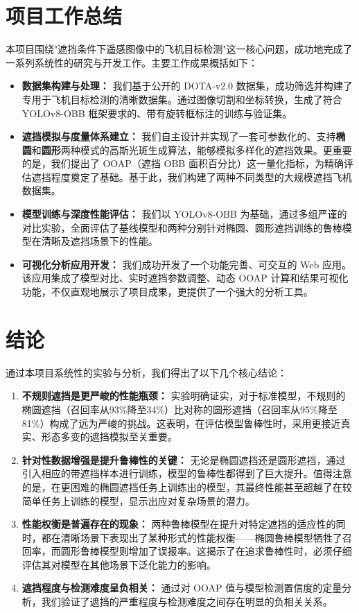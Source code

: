 \documentclass[12pt, a4paper]{report}
\begin{document}
\section{项目工作总结}
本项目围绕"遮挡条件下遥感图像中的飞机目标检测"这一核心问题，成功地完成了一系列系统性的研究与开发工作。主要工作成果概括如下：
\begin{itemize}
    \item \textbf{数据集构建与处理：} 我们基于公开的 DOTA-v2.0 数据集，成功筛选并构建了专用于飞机目标检测的清晰数据集。通过图像切割和坐标转换，生成了符合 YOLOv8-OBB 框架要求的、带有旋转框标注的训练与验证集。
    \item \textbf{遮挡模拟与度量体系建立：} 我们自主设计并实现了一套可参数化的、支持\textbf{椭圆}和\textbf{圆形}两种模式的高斯光斑生成算法，能够模拟多样化的遮挡效果。更重要的是，我们提出了 OOAP（遮挡 OBB 面积百分比）这一量化指标，为精确评估遮挡程度奠定了基础。基于此，我们构建了两种不同类型的大规模遮挡飞机数据集。
    \item \textbf{模型训练与深度性能评估：} 我们以 YOLOv8-OBB 为基础，通过多组严谨的对比实验，全面评估了基线模型和两种分别针对椭圆、圆形遮挡训练的鲁棒模型在清晰及遮挡场景下的性能。
    \item \textbf{可视化分析应用开发：} 我们成功开发了一个功能完善、可交互的 Web 应用。该应用集成了模型对比、实时遮挡参数调整、动态 OOAP 计算和结果可视化功能，不仅直观地展示了项目成果，更提供了一个强大的分析工具。
\end{itemize}

\section{结论}
通过本项目系统性的实验与分析，我们得出了以下几个核心结论：
\begin{enumerate}
    \item \textbf{不规则遮挡是更严峻的性能瓶颈：} 实验明确证实，对于标准模型，不规则的椭圆遮挡（召回率从93\%降至34\%）比对称的圆形遮挡（召回率从95\%降至81\%）构成了远为严峻的挑战。这表明，在评估模型鲁棒性时，采用更接近真实、形态多变的遮挡模拟至关重要。
    \item \textbf{针对性数据增强是提升鲁棒性的关键：} 无论是椭圆遮挡还是圆形遮挡，通过引入相应的带遮挡样本进行训练，模型的鲁棒性都得到了巨大提升。值得注意的是，在更困难的椭圆遮挡任务上训练出的模型，其最终性能甚至超越了在较简单任务上训练的模型，显示出应对复杂场景的潜力。
    \item \textbf{性能权衡是普遍存在的现象：} 两种鲁棒模型在提升对特定遮挡的适应性的同时，都在清晰场景下表现出了某种形式的性能权衡——椭圆鲁棒模型牺牲了召回率，而圆形鲁棒模型则增加了误报率。这揭示了在追求鲁棒性时，必须仔细评估其对模型在其他场景下泛化能力的影响。
    \item \textbf{遮挡程度与检测难度呈负相关：} 通过对 OOAP 值与模型检测置信度的定量分析，我们验证了遮挡的严重程度与检测难度之间存在明显的负相关关系。
\end{enumerate}
\end{document}
